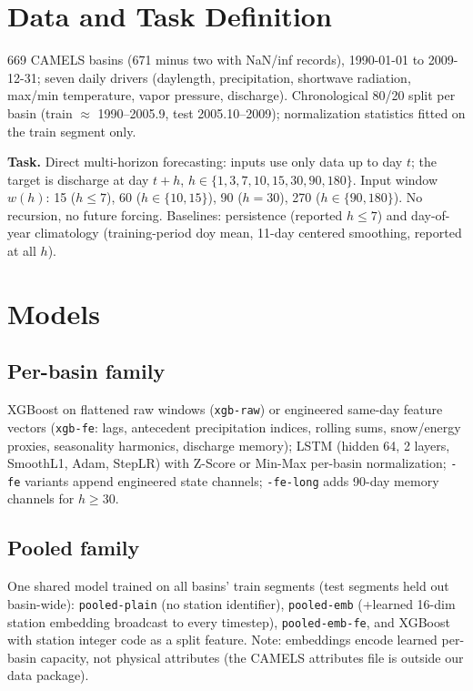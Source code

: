 \documentclass[11pt]{article}
\begin{document}
\section{Data and Task Definition}
\label{sec:data}
669 CAMELS basins (671 minus two with NaN/inf records), 1990-01-01 to
2009-12-31; seven daily drivers (daylength, precipitation, shortwave
radiation, max/min temperature, vapor pressure, discharge). Chronological
80/20 split per basin (train $\approx$ 1990--2005.9, test 2005.10--2009);
normalization statistics fitted on the train segment only.

\textbf{Task.} Direct multi-horizon forecasting: inputs use only data up to
day $t$; the target is discharge at day $t+h$, $h \in \{1,3,7,10,15,30,90,180\}$.
Input window $w(h)$: 15 ($h{\le}7$), 60 ($h{\in}\{10,15\}$), 90 ($h{=}30$),
270 ($h{\in}\{90,180\}$). No recursion, no future forcing. Baselines:
persistence (reported $h{\le}7$) and day-of-year climatology (training-period
doy mean, 11-day centered smoothing, reported at all $h$).

\section{Models}
\subsection{Per-basin family}
XGBoost on flattened raw windows (\texttt{xgb-raw}) or engineered same-day
feature vectors (\texttt{xgb-fe}: lags, antecedent precipitation indices,
rolling sums, snow/energy proxies, seasonality harmonics, discharge memory);
LSTM (hidden 64, 2 layers, SmoothL1, Adam, StepLR) with Z-Score or Min-Max
per-basin normalization; \texttt{-fe} variants append engineered state
channels; \texttt{-fe-long} adds 90-day memory channels for $h \ge 30$.

\subsection{Pooled family}
One shared model trained on all basins' train segments (test segments held
out basin-wide): \texttt{pooled-plain} (no station identifier),
\texttt{pooled-emb} (+learned 16-dim station embedding broadcast to every
timestep), \texttt{pooled-emb-fe}, and XGBoost with station integer code as a
split feature. Note: embeddings encode learned per-basin capacity, not
physical attributes (the CAMELS attributes file is outside our data package).
\end{document}
